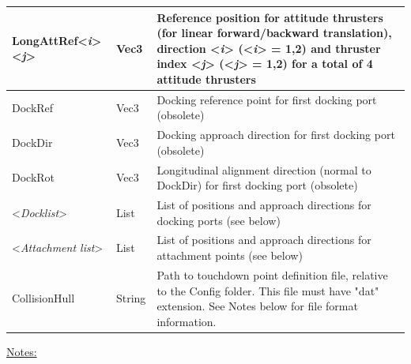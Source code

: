 \documentclass[Orbiter Developer Manual.tex]{subfiles}
\begin{document}
\begin{longtable}{ |p{}|p{}|p{}| }
	\hline\rule{0pt}{2ex}
	LongAttRef<\textit{i}><\textit{j}> & Vec3 & Reference position for attitude thrusters (for linear forward/backward translation), direction <\textit{i}> (<\textit{i}> = 1,2) and thruster index <\textit{j}> (<\textit{j}> = 1,2) for a total of 4 attitude thrusters\\
	\hline\rule{0pt}{2ex}
	DockRef & Vec3 & Docking reference point for first docking port (obsolete)\\
	\hline\rule{0pt}{2ex}
	DockDir & Vec3 & Docking approach direction for first docking port (obsolete)\\
	\hline\rule{0pt}{2ex}
	DockRot & Vec3 & Longitudinal alignment direction (normal to DockDir) for first docking port (obsolete)\\
	\hline\rule{0pt}{2ex}
	<\textit{Docklist}> & List & List of positions and approach directions for docking ports (see below)\\
	\hline\rule{0pt}{2ex}
	<\textit{Attachment list}> & List & List of positions and approach directions for attachment points (see below)\\
	\hline\rule{0pt}{2ex}
	CollisionHull & String & Path to touchdown point definition file, relative to the Config folder. This file must have "dat" extension. See Notes below for file format information.\\
	\hline
	\end{longtable}

\noindent
\underline{Notes:}
\end{document}

